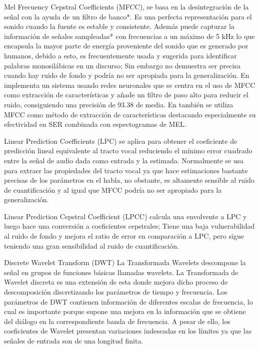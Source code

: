 \documentclass[11pt,a4paper,spanish]{book}
\begin{document}
	Mel Frecuency Cepstral Coefficients (MFCC), se basa en la desintegración de la señal con la ayuda de un filtro de banco*. Es una perfecta representación para el sonido cuando la fuente es estable y consistente. Además puede capturar la información de señales sampleadas* con frecuencias a un máximo de 5 kHz lo que encapsula la mayor parte de energía proveniente del sonido que es generado por humanos, debido a esto, es frecuentemente usada y sugerida para identificar palabras monosilábicas en un discurso; Sin embargo no demuestra ser precisa cuando hay ruido de fondo y podría no ser apropiada para la generalización. En \cite{Sarkania2013} implementa un sistema usando redes neuronales que se centra en el uso de MFCC como extracción de características y añade un filtro  de paso alto para reducir el ruido, consiguiendo una precisión de 93.38 de media. En \cite{Wang2020} también se utiliza MFCC como método de extracción de características destacando especialmente su efectividad en SER combinada con espectogramas de MEL.
	
	Linear Prediction Coefficients (LPC) se aplica para obtener el coeficiente de predicción lineal equivalente al tracto vocal reduciendo el mínimo error cuadrado entre la señal de audio dada como entrada y la estimada. Normalmente se usa para extraer las propiedades del tracto vocal ya que hace estimaciones bastante precisas de los parámetros en el habla, no obstante, es altamente sensible al ruido de cuantificación y al igual que MFCC podría no ser apropiado para la generalización.
	
	Linear Prediction Cepstral Coefficient (LPCC) calcula una envolvente a LPC y luego hace una conversión a coeficientes cepstrales; Tiene una baja vulnerabilidad al ruido de fondo y mejora el ratio de error en comparación a LPC, pero sigue teniendo una gran sensibilidad al ruido de cuantificación.
	
	Discrete Wavelet Transform (DWT) La Transformada Wavelets descompone la señal en grupos de funciones básicas llamadas wavelets. La Transformada de Wavelet discreta es una extensión de esta donde mejora dicho proceso de descomposición discretizando los parámetros de tiempo y frecuencia. Los parámetros de DWT contienen información de diferentes escalas de frecuencia, lo cual es importante porque supone una mejora en la información que se obtiene del diálogo en la correspondiente banda de frecuencia. A pesar de ello, los coeficientes de Wavelet presentan variaciones indeseadas en los límites ya que las señales de entrada son de una longitud finita.
	
\end{document}
